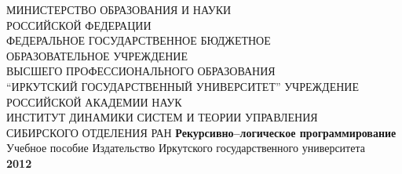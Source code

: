 \documentclass[12pt, openany, twoside]{book} %
\begin{document}
\def\chaptername{Тема}
\def\thechapter{\arabic{chapter}}
\def\thefigure{\arabic{section}.\arabic{figure}}
\def\thetable{\arabic{section}.\arabic{table}}
\fancyhf{} %
\fancyhead[RE]{\slshape \leftmark}
\fancyhead[LO]{\slshape \rightmark}
\fancyhead[RO,LE]{\slshape \thepage}
\renewcommand{\headrulewidth}{1pt}
\renewcommand{\footrulewidth}{0pt}%
\pagestyle{fancy}
\begin{titlepage}
\thispagestyle{empty}
\begin{center}{\sc
МИНИСТЕРСТВО ОБРАЗОВАНИЯ И НАУКИ \\
РОССИЙСКОЙ ФЕДЕРАЦИИ \\
ФЕДЕРАЛЬНОЕ ГОСУДАРСТВЕННОЕ БЮДЖЕТНОЕ \\
ОБРАЗОВАТЕЛЬНОЕ УЧРЕЖДЕНИЕ \\
ВЫСШЕГО ПРОФЕССИОНАЛЬНОГО ОБРАЗОВАНИЯ\\
``ИРКУТСКИЙ ГОСУДАРСТВЕННЫЙ УНИВЕРСИТЕТ''
    УЧРЕЖДЕНИЕ РОССИЙСКОЙ АКАДЕМИИ НАУК \\
ИНСТИТУТ ДИНАМИКИ СИСТЕМ И ТЕОРИИ УПРАВЛЕНИЯ \\
СИБИРСКОГО ОТДЕЛЕНИЯ РАН
}
 \vfill
{\large\bf Рекурсивно--логическое программирование}\\
{Учебное пособие}
\vfill
\vfill
 Издательство Иркутского государственного университета\\
 {\bf 2012}
\end{center}
\end{titlepage}
\end{document}
